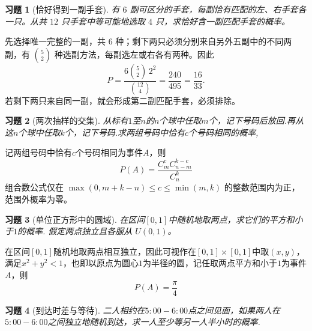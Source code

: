 \documentclass[12pt,fontset=fandol]{ctexart}
\newtheorem{exercise}{习题}[section]
\begin{document}
\begin{exercise}[恰好得到一副手套]\label{q:Y1.9}
有 $6$ 副可区分的手套，每副恰有匹配的左、右手套各一只。从共 $12$ 只手套中等可能地选取 $4$ 只，求恰好含一副匹配手套的概率。\par{}
\end{exercise}

\begin{solve}\label{a:Y1.9}先选择唯一完整的一副，共 $6$ 种；剩下两只必须分别来自另外五副中的不同两副，有 $\binom52$ 种选副方法，每副选左或右各有两种。因此\[P=\frac{6\binom52\,2^2}{\binom{12}4}=\frac{240}{495}=\frac{16}{33}.\]若剩下两只来自同一副，就会形成第二副匹配手套，必须排除。\end{solve}

\begin{exercise}[两次抽样的交集]\label{q:Y1.10}
从标有$1$至$n$的$n$个球中任取$m$个，记下号码后放回.再从这$n$个球中任取$k$个，记下号码.求两组号码中恰有$c$个号码相同的概率,\par{}
\end{exercise}

\begin{solve}\label{a:Y1.10}
记两组号码中恰有$c$个号码相同为事件$A$，则
\[P(A) = \frac{{C_m^cC_{n - m}^{k - c}}}{{C_n^k}}\]
 组合数公式仅在 $\max(0,m+k-n)\le c\le\min(m,k)$ 的整数范围内为正，范围外概率为零。\end{solve}

\begin{exercise}[单位正方形中的圆域]\label{q:Y1.11}
在区间$[0,1]$中随机地取两点，求它们的平方和小于$1$的概率. 假定两点独立且各服从 $U(0,1)$。\par{}
\end{exercise}

\begin{solve}\label{a:Y1.11}
在区间$[0,1]$随机地取两点相互独立，因此可视作在$[0,1]\times [0,1]$中取$(x,y)$，满足$x^2+y^2<1$，也即以原点为圆心$1$为半径的圆，记任取两点平方和小于$1$为事件$A$，则
\[
P(A)=\frac{\pi}{4}
\]
\end{solve}

\begin{exercise}[到达时差与等待]\label{q:Y1.12}
二人相约在$5:00-6:00$点之间见面，如果两人在$5:00-6:00$之间独立地随机到达，求一人至少等另一人半小时的概率.\par{}
\end{exercise}
\end{document}
